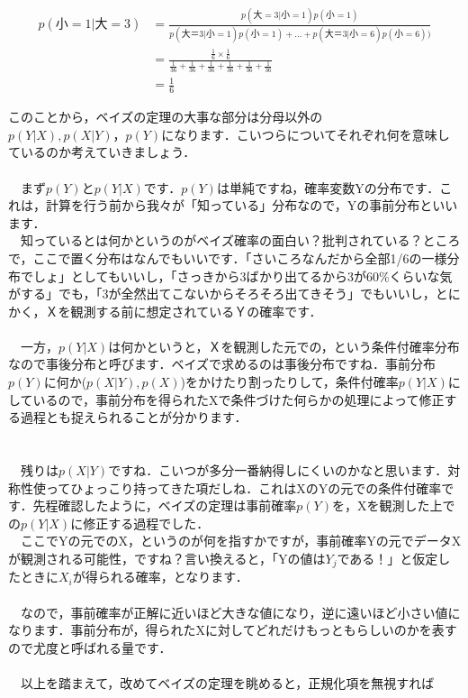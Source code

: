 \documentclass[11pt,a4paper]{ujreport} 	%
\begin{document}
\begin{align}
p(小=1|大=3) &= \frac{p(大=3|小=1)p(小=1)}{p(大＝3|小=1)p(小=1) + ... + p(大＝3|小=6)p(小=6))}\\
&= \frac{\frac{1}{6} \times \frac{1}{6}}{\frac{1}{36} + \frac{1}{36} + \frac{1}{36} + \frac{1}{36} + \frac{1}{36}+ \frac{1}{36}}\\
&= \frac{1}{6}
\end{align}

このことから，ベイズの定理の大事な部分は分母以外の$p(Y|X), p(X|Y)，p(Y)$になります．こいつらについてそれぞれ何を意味しているのか考えていきましょう．\\
\\
　まず$p(Y)$と$p(Y|X)$です．$p(Y)$は単純ですね，確率変数Yの分布です．これは，計算を行う前から我々が「知っている」分布なので，Yの事前分布といいます．\\
　知っているとは何かというのがベイズ確率の面白い？批判されている？ところで，ここで置く分布はなんでもいいです．「さいころなんだから全部1/6の一様分布でしょ」としてもいいし，「さっきから3ばかり出てるから3が60\%くらいな気がする」でも，「3が全然出てこないからそろそろ出てきそう」でもいいし，とにかく，Ｘを観測する前に想定されているＹの確率です．\\
\\
　一方，$p(Y|X)$は何かというと，Ｘを観測した元での，という条件付確率分布なので事後分布と呼びます．ベイズで求めるのは事後分布ですね．事前分布$p(Y)$に何か($p(X|Y), p(X)$)をかけたり割ったりして，条件付確率$p(Y|X)$にしているので，事前分布を得られたXで条件づけた何らかの処理によって修正する過程とも捉えられることが分かります．\\
\\
\\
　残りは$p(X|Y)$ですね．こいつが多分一番納得しにくいのかなと思います．対称性使ってひょっこり持ってきた項だしね．これはXのYの元での条件付確率です．先程確認したように，ベイズの定理は事前確率$p(Y)$を，Xを観測した上での$p(Y|X)$に修正する過程でした．\\
　ここでYの元でのX，というのが何を指すかですが，事前確率Yの元でデータXが観測される可能性，ですね？言い換えると，「Yの値は$Y_j$である！」と仮定したときに$X_i$が得られる確率，となります．\\
\\
　なので，事前確率が正解に近いほど大きな値になり，逆に遠いほど小さい値になります．事前分布が，得られたXに対してどれだけもっともらしいのかを表すので尤度と呼ばれる量です．\\
\\
　以上を踏まえて，改めてベイズの定理を眺めると，正規化項を無視すれば
\end{document}
